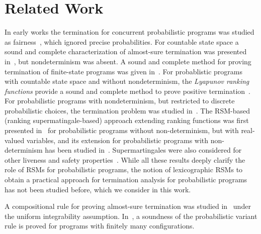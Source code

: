 
\vspace{-1em}
\section{Related Work}
\vspace{-0.5em}

{}
In early works the termination for concurrent probabilistic programs was studied 
as fairness~\cite{SPH84}, which ignored precise probabilities.
For countable state space a sound and complete characterization of almost-sure termination 
was presented in~\cite{HS85}, but nondeterminism was absent.
A sound and complete method for proving termination of finite-state programs
was given in~\cite{EGK12}.
For probablistic programs with countable state space and without 
nondeterminism, the {\em Lyapunov ranking functions} provide a sound and 
complete method to prove positive termination~\cite{BG05,Foster53}.
For probabilistic programs with nondeterminism, but restricted to discrete probabilistic
choices, the termination problem was studied 
in~\cite{MM04,MM05}.
The RSM-based (ranking supermatingale-based) approach extending ranking functions was first 
presented in~\cite{SriramCAV} for probabilistic programs without non-determinism,
but with real-valued variables, and its extension for probabilistic programs
with non-determinism has been studied 
in~\cite{HolgerPOPL,CF17,CFNH16:prob-termination,CFG16,CNZ17,MM16:proofrule-arxiv}. 
Supermartingales were also 
considered for other liveness and safety 
properties~\cite{CVS16:martingale-recurrence-persistence,BEFH16:doob}.
While all these results deeply clarify the role of RSMs for probabilistic programs, 
the notion of lexicographic RSMs to obtain a practical approach for termination 
analysis for probabilistic programs has not been studied before, which we consider in 
this work.

\smallskip{} 
A 
compositional rule for proving almost-sure termination was studied 
in~\cite{HolgerPOPL} under the uniform integrability assumption. 
In~\cite{MM05}, a soundness of the probabilistic variant rule is proved for 
programs with finitely many configurations.


